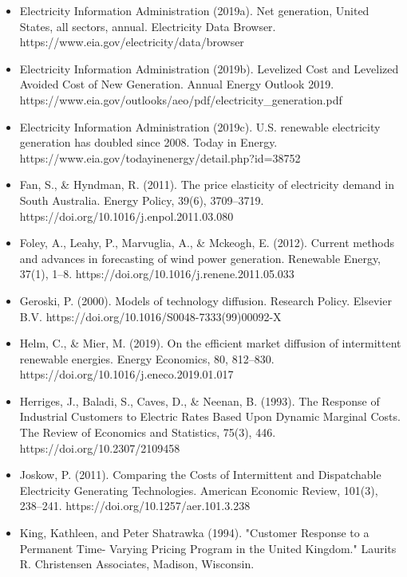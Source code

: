 \documentclass[aspectratio=169]{beamer}
\begin{document}
\begin{frame}[allowframebreaks]
\begin{itemize}
\item Electricity Information Administration (2019a). Net generation, United States, all sectors, annual. Electricity Data Browser. https://www.eia.gov/electricity/data/browser

\item Electricity Information Administration (2019b). Levelized Cost and Levelized Avoided Cost of New Generation. Annual Energy Outlook 2019. https://www.eia.gov/outlooks/aeo/pdf/electricity\_generation.pdf

\item Electricity Information Administration (2019c). U.S. renewable electricity generation has doubled since 2008. Today in Energy. https://www.eia.gov/todayinenergy/detail.php?id=38752

\item Fan, S., \& Hyndman, R. (2011). The price elasticity of electricity demand in South Australia. Energy Policy, 39(6), 3709–3719. https://doi.org/10.1016/j.enpol.2011.03.080

\item Foley, A., Leahy, P., Marvuglia, A., \& Mckeogh, E. (2012). Current methods and advances in forecasting of wind power generation. Renewable Energy, 37(1), 1–8. https://doi.org/10.1016/j.renene.2011.05.033

\item Geroski, P. (2000). Models of technology diffusion. Research Policy. Elsevier B.V. https://doi.org/10.1016/S0048-7333(99)00092-X

\item Helm, C., \& Mier, M. (2019). On the efficient market diffusion of intermittent renewable energies. Energy Economics, 80, 812–830. https://doi.org/10.1016/j.eneco.2019.01.017

\item Herriges, J., Baladi, S., Caves, D., \& Neenan, B. (1993). The Response of Industrial Customers to Electric Rates Based Upon Dynamic Marginal Costs. The Review of Economics and Statistics, 75(3), 446. https://doi.org/10.2307/2109458

\item Joskow, P. (2011). Comparing the Costs of Intermittent and Dispatchable Electricity Generating Technologies. American Economic Review, 101(3), 238–241. https://doi.org/10.1257/aer.101.3.238

\item King, Kathleen, and Peter Shatrawka (1994). "Customer Response to a Permanent Time- Varying
Pricing Program in the United Kingdom." Laurits R. Christensen Associates, Madison,
Wisconsin.


\end{itemize}
\end{frame}
\end{document}
